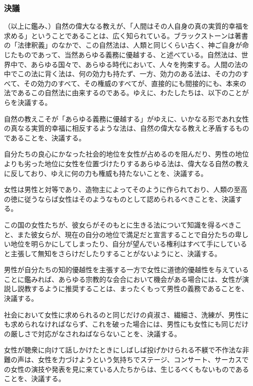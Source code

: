 \subsubsection*{決議}





（以上に鑑み、）自然の偉大なる教えが、「人間はその人自身の真の実質的幸福を求める」ということであることは、広く知られている。ブラックストーンは著書の「法律釈義」のなかで、この自然法は、人類と同じくらい古く、神ご自身が命じたものであって、当然あらゆる義務に優越する、と述べている。自然法は、世界中で、あらゆる国々で、あらゆる時代において、人々を拘束する。人間の法の中でこの法に背く法は、何の効力も持たず、一方、効力のある法は、その力のすべて、その効力のすべて、その権威のすべてが、直接的にも間接的にも、本来の法であるこの自然法に由来するのである。ゆえに、わたしたちは、以下のことがらを決議する。
  
自然の教えこそが「あらゆる義務に優越する」がゆえに、いかなる形であれ女性の真なる実質的幸福に相反するような法は、自然の偉大なる教えと矛盾するものであることを、決議する。

自分たちの良心にかなった社会的地位を女性が占めるのを阻んだり、男性の地位よりも劣った地位に女性を位置づけたりするあらゆる法は、偉大なる自然の教えに反しており、ゆえに何の力も権威も持たないことを、決議する。

女性は男性と対等であり、造物主によってそのように作られており、人類の至高の徳に従うならば女性はそのようなものとして認められるべきことを、決議する。

この国の女性たちが、彼女らがそのもとに生きる法について知識を得るべきこと、また彼女らが、現在の自分の地位で満足だと宣言することで自分たちの卑しい地位を明らかにしてしまったり、自分が望んでいる権利はすべて手にしていると主張して無知をさらけだしたりすることがないようにと、決議する。

男性が自分たちの知的優越性を主張する一方で女性に道徳的優越性を与えていることに鑑みれば、あらゆる宗教的な会合において機会がある場合には、女性が演説し説教するように推奨することは、まったくもって男性の義務であることを、決議する。

社会において女性に求められるのと同じだけの貞淑さ、繊細さ、洗練が、男性にも求められなければならず、これを破った場合には、男性にも女性にも同じだけの厳しさで対応がなされねばならないことを、決議する。

女性が聴衆に向けて話しかけたときにしばしば投げかけられる不躾で不作法な非難の声は、女性を力づけようという気持ちでステージ、コンサート、サーカスでの女性の演技や発表を見に来ている人たちからは、生じるべくもないものであることを、決議する。

